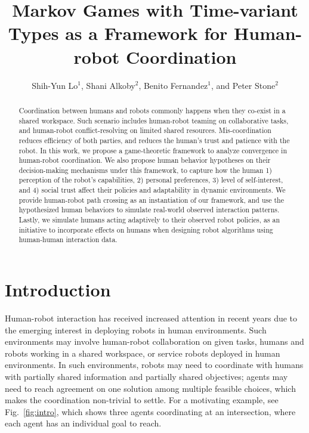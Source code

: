 \documentclass[letterpaper, 10 pt, conference]{ieeeconf}  %
\title{\LARGE \bf
Markov Games with Time-variant Types as a Framework for Human-robot Coordination
}
\author{Shih-Yun Lo$^{1}$, Shani Alkoby$^{2}$, Benito Fernandez$^{1}$, and Peter Stone$^{2}$%
}
\begin{document}
\maketitle
\thispagestyle{empty}
\pagestyle{empty}
\begin{abstract}
  Coordination between humans and robots commonly happens when they 
  co-exist in a shared workspace. Such scenario includes human-robot teaming on 
  collaborative tasks, and 
  human-robot conflict-resolving on limited shared resources. Mis-coordination 
  reduces 
  efficiency of both parties, and reduces the human's trust and patience with 
  the robot. In this work, we propose a game-theoretic framework to analyze 
  convergence in 
  human-robot coordination.
  We also propose human behavior hypotheses on their 
  decision-making mechanisms under this framework, 
  to capture how the human 1) perception of the robot's capabilities, 2) personal preferences, 3) level of self-interest, and 4) social 
  trust affect their policies and adaptability in dynamic environments. 
  We provide human-robot path crossing as an instantiation of our framework, and use the 
  hypothesized human behaviors to simulate real-world observed interaction 
  patterns. Lastly, we simulate humans acting adaptively to their observed robot 
  policies, as an initiative to incorporate effects on humans when designing 
  robot algorithms using human-human interaction data.
\end{abstract}
\vspace{-.3em}
\section{Introduction}
\vspace{-.2em}
Human-robot interaction has received increased attention in recent years due to the 
emerging interest in deploying robots in human environments. Such 
environments may involve human-robot collaboration on given tasks, 
humans and robots working in a shared workspace, or service 
robots deployed in human environments. In such environments, robots 
may need to coordinate with humans with partially shared information and 
partially shared objectives; agents may need to reach agreement on one 
solution among multiple feasible choices, which makes the coordination non-trivial to 
settle. For a motivating example, see Fig.~\ref{fig:intro}, which shows three agents coordinating at an 
intersection, where each agent has an individual goal to reach. 
\end{document}
